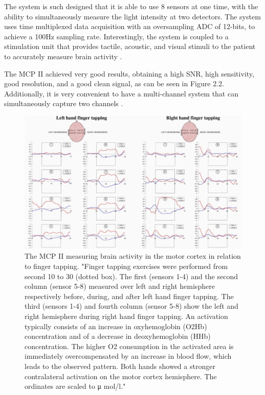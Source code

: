 The system is such designed that it is able to use 8 sensors at one time, with the ability to simultaneously measure the light intensity at two detectors. The system uses time multiplexed data acquisition with an oversampling ADC of 12-bits, to achieve a 100Hz sampling rate. Interestingly, the system is coupled to a stimulation unit that provides tactile, acoustic, and visual stimuli to the patient to accurately measure brain activity \cite{wolf05}.

The MCP II achieved very good results, obtaining a high SNR, high sensitivity, good resolution, and a good clean signal, as can be seen in Figure 2.2. Additionally, it is very convenient to have a multi-channel system that can simultaneously capture two channels \cite{wolf05}.

\begin{figure}[htp]
\centering
\includegraphics[width=6in]{mcp_t.png}
\caption[MCP II Measuring Motor Movement]{The MCP II measuring brain activity in the motor cortex in relation to finger tapping. "Finger tapping exercises were performed from second 10 to 30 (dotted box). The first (sensors 1-4) and the second column (sensor 5-8) measured over left and right hemisphere respectively before, during, and after left hand finger tapping. The third (sensors 1-4) and fourth column (sensor 5-8) show the left and right hemisphere during right hand finger tapping. An activation typically consists of an increase in oxyhemoglobin (O2Hb) concentration and of a decrease in deoxyhemoglobin (HHb) concentration. The higher O2 consumption in the activated area is immediately overcompensated by an increase in blood flow, which leads to the observed pattern. Both hands showed a stronger contralateral activation on the motor cortex hemisphere. The ordinates are scaled to μ mol/l." \cite{wolf05}}
\end{figure}

